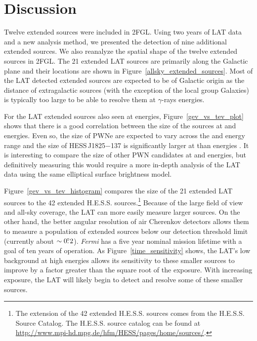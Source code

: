 \documentclass[12pt,preprint]{aastex}
\newcommand{\gev}{\text{GeV}\xspace}
\newcommand{\tev}{\text{TeV}\xspace}
\newcommand{\fermi}{\textit{Fermi}\xspace}
\begin{document}
\section{Discussion}

Twelve extended sources were included in 2FGL.  Using two years of
LAT data and a new analysis method, we presented the detection of
nine additional extended sources. We also reanalyze the spatial
shape of the twelve extended sources in 2FGL.  The 21 extended
LAT sources are primarily along the Galactic plane 
and their locations are shown in
Figure~\ref{allsky_extended_sources}.  Most of the LAT detected
extended sources are
expected to be of Galactic origin as the distance of extragalactic
sources (with the exception of the local group Galaxies) is typically too
large to be able to resolve them at $\gamma$-rays energies.

For the LAT extended sources also seen at \tev energies,
Figure~\ref{gev_vs_tev_plot} shows that there is a good correlation
between the size of the sources at \gev and \tev energies. Even
so, the size of PWNe are expected to vary across the \gev and \tev
energy range and the size of HESS\,J1825$-$137 is significantly larger at
\gev than \tev energies \citep{fermi_hess_j1825}.  It is interesting to
compare the size of other PWN candidates at \gev and \tev energies, 
but definitively
measuring this would require a more in-depth analysis of the LAT data
using the same elliptical surface brightness model.

Figure~\ref{gev_vs_tev_histogram} compares the size of the 21 extended
LAT sources to the 42 extended H.E.S.S. sources.\footnote{The 
\tev extension of
the 42 extended H.E.S.S. sources comes from the H.E.S.S. Source
Catalog. The H.E.S.S. source catalog can be found at \url{http://www.mpi-hd.mpg.de/hfm/HESS/pages/home/sources/}.}
Because of the large
field of view and all-sky coverage, the LAT can more easily measure
larger sources.  On the other hand, the 
better
angular resolution of air Cherenkov detectors allows them to measure a
population of extended sources below our detection threshold limit (currently 
about $\sim0\mbox{$.\!\!^\circ$}2$).  \fermi has a five year nominal mission lifetime with
a goal of ten years of operation.  As Figure~\ref{time_sensitivity} shows,
the LAT's low background at high energies allows its sensitivity 
to
these smaller sources to improve by a factor greater than the square root
of the exposure.  With increasing exposure, the LAT will likely begin to
detect and resolve some of these smaller \tev sources.
\end{document}
